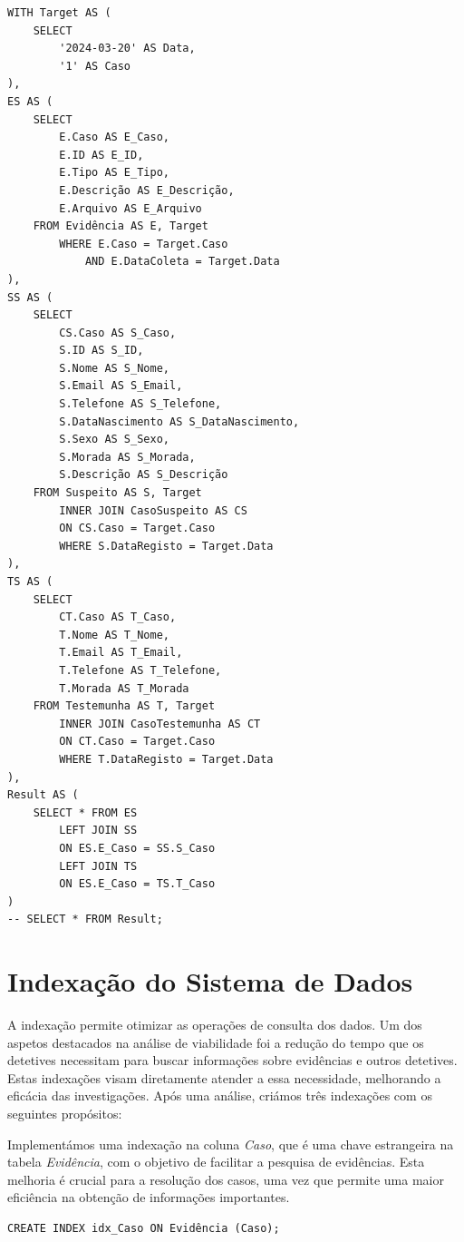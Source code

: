 \documentclass[a4paper,12pt]{scrreprt}
\begin{document}
\vspace{0.4cm}
\begin{lstlisting}[escapechar=!]
WITH Target AS (
    SELECT
        '2024-03-20' AS Data,
        '1' AS Caso
),
ES AS (
    SELECT
        E.Caso AS E_Caso,
        E.ID AS E_ID,
        E.Tipo AS E_Tipo,
        E.Descrição AS E_Descrição,
        E.Arquivo AS E_Arquivo
    FROM Evidência AS E, Target
        WHERE E.Caso = Target.Caso
            AND E.DataColeta = Target.Data
),
SS AS (
    SELECT
        CS.Caso AS S_Caso,
        S.ID AS S_ID,
        S.Nome AS S_Nome,
        S.Email AS S_Email,
        S.Telefone AS S_Telefone,
        S.DataNascimento AS S_DataNascimento,
        S.Sexo AS S_Sexo,
        S.Morada AS S_Morada,
        S.Descrição AS S_Descrição
    FROM Suspeito AS S, Target
        INNER JOIN CasoSuspeito AS CS
        ON CS.Caso = Target.Caso
        WHERE S.DataRegisto = Target.Data
),
TS AS (
    SELECT
        CT.Caso AS T_Caso,
        T.Nome AS T_Nome,
        T.Email AS T_Email,
        T.Telefone AS T_Telefone,
        T.Morada AS T_Morada
    FROM Testemunha AS T, Target
        INNER JOIN CasoTestemunha AS CT
        ON CT.Caso = Target.Caso
        WHERE T.DataRegisto = Target.Data
),
Result AS (
	SELECT * FROM ES
        LEFT JOIN SS
        ON ES.E_Caso = SS.S_Caso
        LEFT JOIN TS
        ON ES.E_Caso = TS.T_Caso
)
-- SELECT * FROM Result;
\end{lstlisting}


\section{Indexação do Sistema de Dados}

A indexação permite otimizar as operações de consulta dos dados. Um dos aspetos destacados na análise de viabilidade foi a redução do tempo que os detetives necessitam para buscar informações sobre evidências e outros detetives. Estas indexações visam diretamente atender a essa necessidade, melhorando a eficácia das investigações. Após uma análise, criámos três indexações com os seguintes propósitos:

Implementámos uma indexação na coluna \textit{Caso}, que é uma chave estrangeira na tabela \textit{Evidência}, com o objetivo de facilitar a pesquisa de evidências. Esta melhoria é crucial para a resolução dos casos, uma vez que permite uma maior eficiência na obtenção de informações importantes. 

\vspace{0.4cm}
\begin{lstlisting}[escapechar=!, numbers=none]
CREATE INDEX idx_Caso ON Evidência (Caso);
\end{lstlisting}
\vspace{0.6cm}
\end{document}
